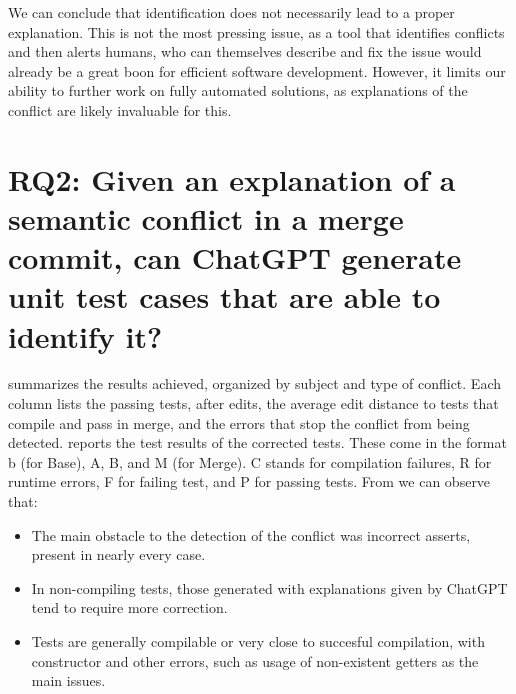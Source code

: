 We can conclude that identification does not necessarily lead to a proper explanation. 
This is not the most pressing issue, as a tool that identifies conflicts and then alerts humans, who can themselves describe and fix the issue would already be a great boon for efficient software development.
However, it limits our ability to further work on fully automated solutions, as explanations of the conflict are likely invaluable for this.


\section[Research Question 2: Test Generation]{RQ2: Given an explanation of a semantic conflict in a merge
commit, can ChatGPT generate unit test cases that are able to identify it?}\label{sec:results:rq2}

 summarizes the results achieved, organized by subject and
type of conflict.
Each column lists the passing tests, after edits, the average edit distance to tests that compile and pass in merge,
and the errors that stop the conflict from being detected.
%
 reports the test results of the corrected tests.
These come in the format b (for Base), A, B, and M (for Merge). C stands for compilation failures, R for runtime errors, F for failing test, and P for passing tests.
From  we can observe that:
\begin{itemize}
  \item The main obstacle to the detection of the conflict was incorrect asserts, present in nearly every case.
  \item In non-compiling tests, those generated with explanations given by ChatGPT tend to require more correction.
  \item Tests are generally compilable or very close to succesful compilation, with constructor and other errors, such as usage of non-existent getters as the main issues.
\end{itemize}

